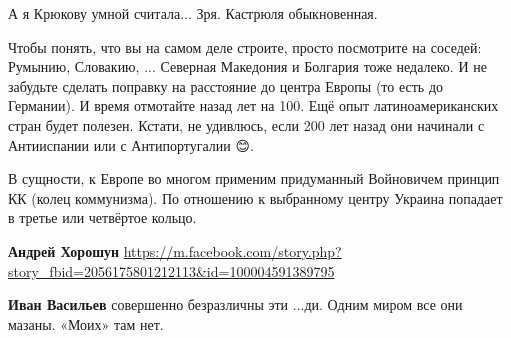 \begin{itemize}
 
А я Крюкову умной считала... Зря. Кастрюля обыкновенная.

 
Чтобы понять, что вы на самом деле строите, просто посмотрите на соседей:
Румынию, Словакию, ... Северная Македония и Болгария тоже недалеко. И не
забудьте сделать поправку на расстояние до центра Европы (то есть до Германии).
И время отмотайте назад лет на 100. Ещё опыт латиноамериканских стран будет
полезен. Кстати, не удивлюсь, если 200 лет назад они начинали с Антииспании или
с Антипортугалии 😊.

\begin{itemize}
 
В сущности, к Европе во многом применим придуманный Войновичем принцип КК (колец коммунизма). По отношению к выбранному центру Украина попадает в третье или четвёртое кольцо.
\end{itemize}

 
\textbf{Андрей Хорошун} \url{https://m.facebook.com/story.php?story_fbid=2056175801212113&id=100004591389795}


\begin{itemize}
 
\textbf{Иван Васильев} совершенно безразличны эти ...ди. Одним миром все они мазаны. «Моих» там нет.

 

\end{itemize}
\end{itemize}
